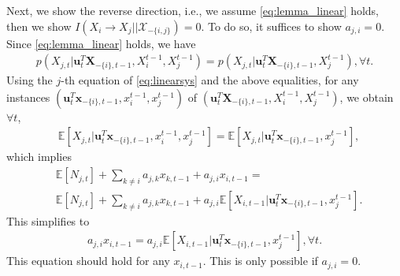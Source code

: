 Next, we show the reverse direction, i.e.,  we assume \eqref{eq:lemma_linear} holds, then we show $I(X_i\rightarrow X_j||\mathcal{X}_{-\{i,j\}})=0$. To do so, it suffices to show $a_{j,i}=0$.
Since \eqref{eq:lemma_linear} holds, we have 
\begin{align*}
    {p(X_{j,t}|\textbf{u}_t^T\textbf{X}_{-\{i\},t-1},{X}_{i}^{t-1},{X}_{j}^{t-1})}={p(X_{j,t}|\textbf{u}_t^T\textbf{X}_{-\{i\},t-1},{X}_{j}^{t-1})}, \forall t.
\end{align*}
Using the $j$-th equation of \eqref{eq:linearsys} and the above equalities, for any instances $(\textbf{u}_t^T\textbf{x}_{-\{i\},t-1},{x}_{i}^{t-1},{x}_{j}^{t-1})$ of $(\textbf{u}_t^T\textbf{X}_{-\{i\},t-1},{X}_{i}^{t-1},{X}_{j}^{t-1})$, we obtain $\forall t$,
\begin{align*}
    &\mathbb{E}\left[{X_{j,t}|\textbf{u}_t^T\textbf{x}_{-\{i\},t-1},{x}_{i}^{t-1},{x}_{j}^{t-1}}\right]=\mathbb{E}\left[{X_{j,t}|\textbf{u}_t^T\textbf{x}_{-\{i\},t-1},{x}_{j}^{t-1}}\right],
\end{align*}
which implies
\begin{align*}
    &\mathbb{E}\left[N_{j,t}\right]+\sum_{k\neq i}a_{j,k}x_{k,t-1}+a_{j,i}x_{i,t-1}=\\
    &\mathbb{E}\left[N_{j,t}\right]+\sum_{k\neq i}a_{j,k}x_{k,t-1}
    +a_{j,i}\mathbb{E}\left[X_{i,t-1}|\textbf{u}_t^T\textbf{x}_{-\{i\},t-1},{x}_{j}^{t-1}\right].
\end{align*}
This simplifies to  
\begin{align*}
    a_{j,i}x_{i,t-1}=a_{j,i}\mathbb{E}\left[X_{i,t-1}|\textbf{u}_t^T\textbf{x}_{-\{i\},t-1},{x}_{j}^{t-1}\right], \forall t.
\end{align*}
This equation should hold for any $x_{i,t-1}$. This is only possible if $a_{j,i}=0$.





